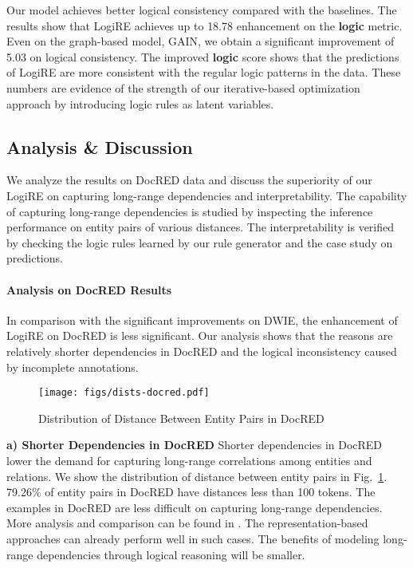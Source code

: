\documentclass[11pt]{article}
\newcommand{\mymodel}{LogiRE\xspace}
\begin{document}
Our model achieves better logical consistency compared with the baselines. The results show that \mymodel achieves up to 18.78 enhancement on the \textbf{logic} metric. Even on the graph-based model, GAIN, we obtain a significant improvement of 5.03 on logical consistency. The improved \textbf{logic} score shows that the predictions of \mymodel are more consistent with the regular logic patterns in the data. These numbers are evidence of the strength of our iterative-based optimization approach by introducing logic rules as latent variables.


\subsection{Analysis \& Discussion}
We analyze the results on DocRED data and discuss the superiority of our \mymodel on capturing long-range dependencies and interpretability. The capability of capturing long-range dependencies is studied by inspecting the inference performance on entity pairs of various distances. The interpretability is verified by checking the logic rules learned by our rule generator and the case study on predictions. 

\paragraph{Analysis on DocRED Results}
\label{sec:exp:analysis:docred}
In comparison with the significant improvements on DWIE, the enhancement of \mymodel on DocRED is less significant. Our analysis shows that the reasons are relatively shorter dependencies in DocRED and the logical inconsistency caused by incomplete annotations.

\begin{figure}
    \centering
    \texttt{[image: figs/dists-docred.pdf]}
    \caption{Distribution of Distance Between Entity Pairs in DocRED}
    \label{fig:dists-docred}
\end{figure}

\textbf{a) Shorter Dependencies in DocRED}
Shorter dependencies in DocRED lower the demand for capturing long-range correlations among entities and relations. We show the distribution of distance between entity pairs in Fig.~\ref{fig:dists-docred}. 79.26\% of entity pairs in DocRED have distances less than 100 tokens. The examples in DocRED are less difficult on capturing long-range dependencies. More analysis and comparison can be found in \citet{zaporojets2020dwie}. The representation-based approaches can already perform well in such cases. The benefits of modeling long-range dependencies through logical reasoning will be smaller.
\end{document}
